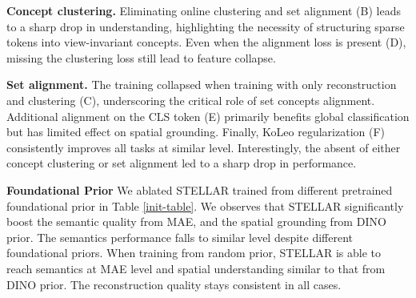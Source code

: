 \textbf{Concept clustering.}
Eliminating online clustering and set alignment (B) leads to a sharp drop in understanding, highlighting the necessity of structuring sparse tokens into view-invariant concepts. Even when the alignment loss is present (D), missing the clustering loss still lead to feature collapse. 

\textbf{Set alignment.}
The training collapsed when training with only reconstruction and clustering (C), underscoring the critical role of set concepts alignment. Additional alignment on the CLS token (E) primarily benefits global classification but has limited effect on spatial grounding. Finally, KoLeo regularization (F) consistently improves all tasks at similar level. Interestingly, the absent of either concept clustering or set alignment led to a sharp drop in performance.

\textbf{Foundational Prior} We ablated STELLAR trained from different pretrained foundational prior in Table \ref{init-table}. We observes that STELLAR significantly boost the semantic quality from MAE, and the spatial grounding from DINO prior. The semantics performance falls to similar level despite different foundational priors. When training from random prior, STELLAR is able to reach semantics at MAE level and spatial understanding similar to that from DINO prior. The reconstruction quality stays consistent in all cases.








